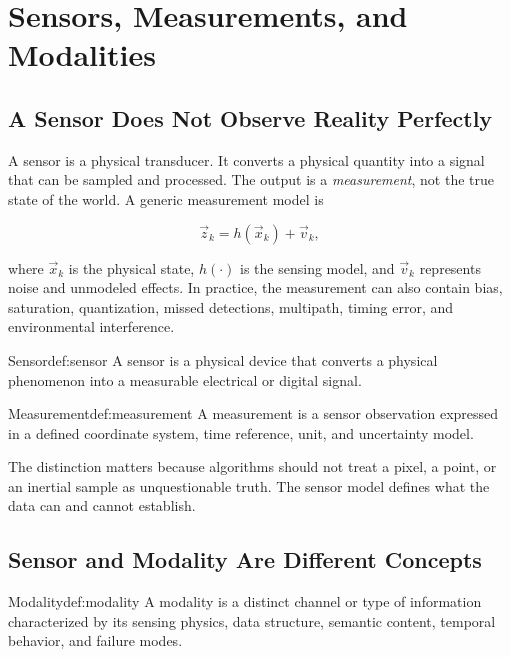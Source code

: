 \chapter{Sensors, Measurements, and Modalities}
\label{chap:sensors-modalities}

\section{A Sensor Does Not Observe Reality Perfectly}

A sensor is a physical transducer. It converts a physical quantity into a signal that can be sampled and processed. The output is a \emph{measurement}, not the true state of the world. A generic measurement model is

\[
    \vec{z}_k = h(\vec{x}_k) + \vec{v}_k,
\]

where \(\vec{x}_k\) is the physical state, \(h(\cdot)\) is the sensing model, and \(\vec{v}_k\) represents noise and unmodeled effects. In practice, the measurement can also contain bias, saturation, quantization, missed detections, multipath, timing error, and environmental interference.

\begin{definition}{Sensor}{def:sensor}
A sensor is a physical device that converts a physical phenomenon into a measurable electrical or digital signal.
\end{definition}

\begin{definition}{Measurement}{def:measurement}
A measurement is a sensor observation expressed in a defined coordinate system, time reference, unit, and uncertainty model.
\end{definition}

The distinction matters because algorithms should not treat a pixel, a point, or an inertial sample as unquestionable truth. The sensor model defines what the data can and cannot establish.

\section{Sensor and Modality Are Different Concepts}

\begin{definition}{Modality}{def:modality}
A modality is a distinct channel or type of information characterized by its sensing physics, data structure, semantic content, temporal behavior, and failure modes.
\end{definition}

